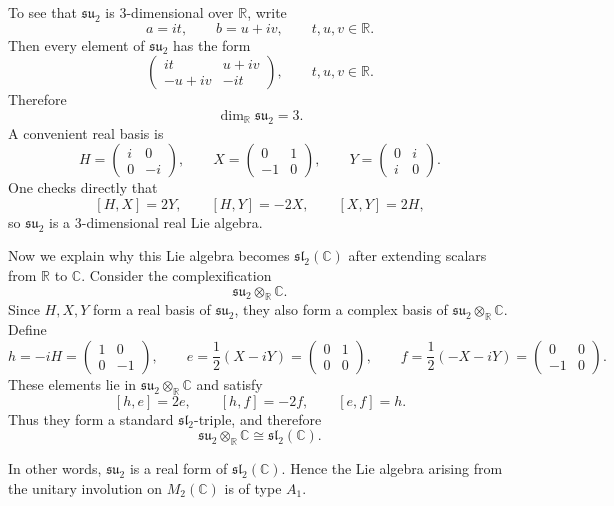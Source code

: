 \documentclass[11pt, a4paper]{report}
\begin{document}
\begin{example}
    To see that $\mathfrak{su}_{2}$ is $3$-dimensional over $\mathbb{R}$, write
    \[
    a=it,\qquad b=u+iv,
    \qquad t,u,v\in\mathbb{R}.
    \]
    Then every element of $\mathfrak{su}_{2}$ has the form
    \[
    \begin{pmatrix}
    it & u+iv\\
    -u+iv & -it
    \end{pmatrix},
    \qquad t,u,v\in\mathbb{R}.
    \]
    Therefore
    \[
    \dim_{\mathbb{R}}\mathfrak{su}_{2}=3.
    \]
    A convenient real basis is
    \[
    H=
    \begin{pmatrix}
    i&0\\
    0&-i
    \end{pmatrix},
    \qquad
    X=
    \begin{pmatrix}
    0&1\\
    -1&0
    \end{pmatrix},
    \qquad
    Y=
    \begin{pmatrix}
    0&i\\
    i&0
    \end{pmatrix}.
    \]
    One checks directly that
    \[
    [H,X]=2Y,\qquad [H,Y]=-2X,\qquad [X,Y]=2H,
    \]
    so $\mathfrak{su}_{2}$ is a $3$-dimensional real Lie algebra.
    
    Now we explain why this Lie algebra becomes $\mathfrak{sl}_{2}(\mathbb{C})$ after extending scalars
    from $\mathbb{R}$ to $\mathbb{C}$. Consider the complexification
    \[
    \mathfrak{su}_{2}\otimes_{\mathbb{R}}\mathbb{C}.
    \]
    Since $H,X,Y$ form a real basis of $\mathfrak{su}_{2}$, they also form a complex basis of
    $\mathfrak{su}_{2}\otimes_{\mathbb{R}}\mathbb{C}$. Define
    \[
    h=-iH=
    \begin{pmatrix}
    1&0\\
    0&-1
    \end{pmatrix},
    \qquad
    e=\frac{1}{2}(X-iY)=
    \begin{pmatrix}
    0&1\\
    0&0
    \end{pmatrix},
    \qquad
    f=\frac{1}{2}(-X-iY)=
    \begin{pmatrix}
    0&0\\
    -1&0
    \end{pmatrix}.
    \]
    These elements lie in $\mathfrak{su}_{2}\otimes_{\mathbb{R}}\mathbb{C}$ and satisfy
    \[
    [h,e]=2e,\qquad [h,f]=-2f,\qquad [e,f]=h.
    \]
    Thus they form a standard $\mathfrak{sl}_{2}$-triple, and therefore
    \[
    \mathfrak{su}_{2}\otimes_{\mathbb{R}}\mathbb{C}\cong \mathfrak{sl}_{2}(\mathbb{C}).
    \]
    
    In other words, $\mathfrak{su}_{2}$ is a real form of $\mathfrak{sl}_{2}(\mathbb{C})$. Hence the Lie
    algebra arising from the unitary involution on $M_{2}(\mathbb{C})$ is of type $A_{1}$.
    \end{example}
\end{document}
